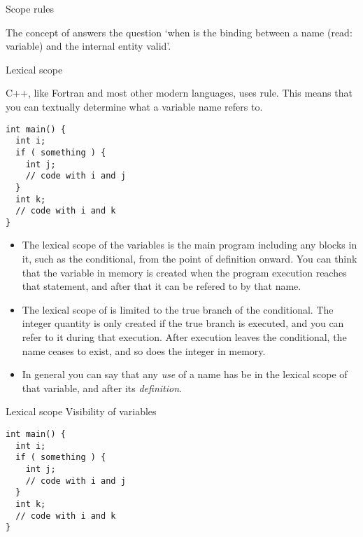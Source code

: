
 {Scope rules}

The concept of  answers the question `when is the
binding between a name (read: variable) and the internal entity valid'.

 {Lexical scope}

C++, like Fortran and most other modern languages, uses
 rule. This means that you can textually
determine what a variable name refers to.
\begin{lstlisting}
int main() {
  int i;
  if ( something ) {
    int j;
    // code with i and j
  }
  int k;
  // code with i and k
}
\end{lstlisting}
\begin{itemize}
\item The lexical scope of the variables  is the main program
  including any blocks in it, such as the conditional, from the point
  of definition onward. You can think that the variable in memory is
  created when the program execution reaches that statement, and after
  that it can be refered to by that name.
\item The lexical scope of  is limited to the true branch of the
  conditional. The integer quantity is only created if the true branch
  is executed, and you can refer to it during that execution. After
  execution leaves the conditional, the name ceases to exist, and so
  does the integer in memory.
\item In general you can say that any
  \emph{use}
  of a name has be in the lexical scope of that variable, and after
  its \emph{definition}.
\end{itemize}

\begin{slide}{Lexical scope}
  \label{sl:lexical}
  Visibility of variables
\begin{lstlisting}
int main() {
  int i;
  if ( something ) {
    int j;
    // code with i and j
  }
  int k;
  // code with i and k
}
\end{lstlisting}  
\end{slide}

